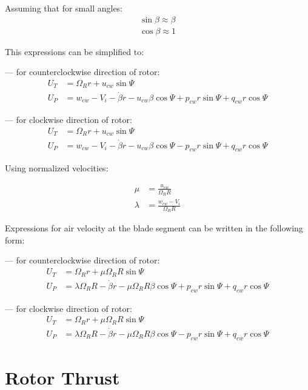 Assuming that for small angles:
\begin{align}
  \label{eq-aero-sin-beta-approx}
  \sin \beta \approx \beta \\
  \label{eq-aero-cos-beta-approx}
  \cos \beta \approx 1
\end{align}

This expressions can be simplified to:

--- for counterclockwise direction of rotor:
\begin{align}
  U_T &= \Omega_R r + u_{cw} \sin \Psi \\
  U_P &=
  w_{cw} - V_i - \dot \beta r - u_{cw} \beta \cos \Psi
  + p_{cw} r \sin \Psi + q_{cw} r \cos \Psi
\end{align}

--- for clockwise direction of rotor:
  \begin{align}
    U_T &= \Omega_R r + u_{cw} \sin \Psi \\
    U_P &=
    w_{cw} - V_i - \dot \beta r - u_{cw} \beta \cos \Psi
    - p_{cw} r \sin \Psi + q_{cw} r \cos \Psi
  \end{align}

Using normalized velocities:

\begin{align}
  \mu     &= \frac{u_{cw}}{\Omega_R R} \\
  \lambda &= \frac{w_{cw} - V_i}{\Omega_R R}
\end{align}

Expressions for air velocity at the blade segment can be written in the following form:

--- for counterclockwise direction of rotor:
\begin{align}
  U_T &= \Omega_R r + \mu \Omega_R R \sin \Psi \\
  U_P &=
  \lambda \Omega_R R - \dot \beta r - \mu \Omega_R R \beta \cos \Psi
  + p_{cw} r \sin \Psi + q_{cw} r \cos \Psi
\end{align}

--- for clockwise direction of rotor:
\begin{align}
  U_T &= \Omega_R r + \mu \Omega_R R \sin \Psi \\
  U_P &=
  \lambda \Omega_R R - \dot \beta r - \mu \Omega_R R \beta \cos \Psi
  - p_{cw} r \sin \Psi + q_{cw} r \cos \Psi
\end{align}


\section{Rotor Thrust}

